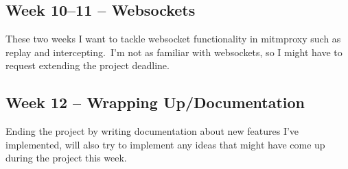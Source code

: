 \subsection{Week 10--11 -- Websockets}
\label{subsec:week-10-11}

These two weeks I want to tackle websocket functionality in mitmproxy such as replay and intercepting.\ I'm not
as familiar with websockets, so I might have to request extending the project deadline.


\subsection{Week 12 -- Wrapping Up/Documentation}
\label{subsec:week-12}

Ending the project by writing documentation about new features I've implemented, will also try to implement any
ideas that might have come up during the project this week.\

